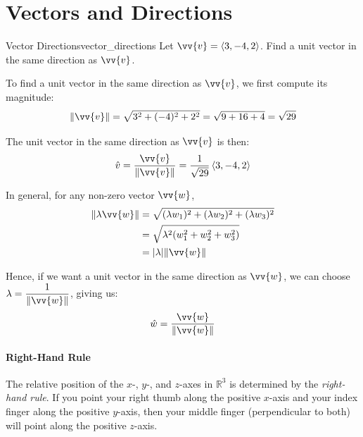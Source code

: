 \section{Vectors and Directions}

\begin{problem}{Vector Directions}{vector_directions}
Let $\vv{v} = \ang{3, -4, 2}$. Find a unit vector in the same direction as $\vv{v}$.
\end{problem}

\begin{sol}
To find a unit vector in the same direction as $\vv{v}$, we first compute its magnitude:
\[
\norm{\vv{v}} = \sqrt{3^2 + (-4)^2 + 2^2} = \sqrt{9 + 16 + 4} = \sqrt{29}
\]

The unit vector in the same direction as $\vv{v}$ is then:
\[
\hat{v} = \frac{\vv{v}}{\norm{\vv{v}}} = \frac{1}{\sqrt{29}} \ang{3, -4, 2}
\]
\end{sol}

In general, for any non-zero vector $\vv{w}$, 
\begin{align*}
\norm{\lambda \vv{w}} &= \sqrt{(\lambda w_1)^2 + (\lambda w_2)^2 + (\lambda w_3)^2} \\
                      &= \sqrt{\lambda^2 (w_1^2 + w_2^2 + w_3^2)} \\
                      &= |\lambda| \norm{\vv{w}}
\end{align*}

Hence, if we want a unit vector in the same direction as $\vv{w}$, we can choose $\lambda = \displaystyle\frac{1}{\norm{\vv{w}}}$, giving us:
\[
\hat{w} = \frac{\vv{w}}{\norm{\vv{w}}}
\]

\paragraph{Right-Hand Rule}
The relative position of the $x$-, $y$-, and $z$-axes in $\mathbb{R}^3$ is determined by the \textit{right-hand rule}. If you point your right thumb along the positive $x$-axis and your index finger along the positive $y$-axis, then your middle finger (perpendicular to both) will point along the positive $z$-axis.

